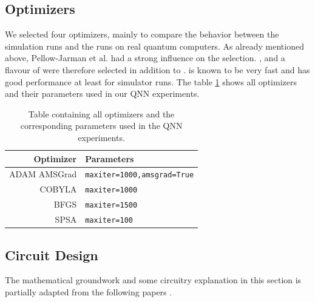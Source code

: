 \clearpage

\subsection{Optimizers}
We selected four optimizers, mainly to compare the behavior between the simulation runs and the runs on real quantum computers. As already mentioned above, Pellow-Jarman et al\cite{pellow-jarman_comparison_2021}. had a strong influence on the selection. ,  and a flavour of  were therefore selected in addition to .  is known to be very fast and has good performance at least for simulator runs. The table \ref{table:qnn_optimizers_and_ parameters} shows all optimizers and their parameters used in our QNN experiments.

\begin{table}[!h]
    \centering
    \begin{tabular}{rl}
    \hline
    \textbf{Optimizer}      & \textbf{Parameters}                                      \\ \hline
    ADAM AMSGrad\tablefootnote{\url{https://qiskit.org/documentation/stubs/qiskit.algorithms.optimizers.ADAM.html#qiskit.algorithms.optimizers.ADAM}} & \texttt{maxiter=1000,amsgrad=True}  \\ \hline
    COBYLA\tablefootnote{\url{https://qiskit.org/documentation/stubs/qiskit.algorithms.optimizers.COBYLA.html#qiskit.algorithms.optimizers.COBYLA}} & \texttt{maxiter=1000}               \\ \hline
    BFGS\tablefootnote{\url{https://qiskit.org/documentation/stubs/qiskit.algorithms.optimizers.L_BFGS_B.html#qiskit.algorithms.optimizers.L_BFGS_B}} & \texttt{maxiter=1500}               \\ \hline
    SPSA\tablefootnote{\url{https://qiskit.org/documentation/stubs/qiskit.algorithms.optimizers.SPSA.html#qiskit.algorithms.optimizers.SPSA}} & \texttt{maxiter=100}                \\ \hline
    \end{tabular}
    \caption{Table containing all optimizers and the corresponding parameters used in the QNN experiments.}
    \label{table:qnn_optimizers_and_ parameters}
\end{table}

\clearpage

\subsection{Circuit Design}
The mathematical groundwork and some circuitry explanation in this section is partially adapted from the following papers \cite{havlicekSupervisedLearningQuantum2019,ThomsenComparingQNNs_QSVM}.


